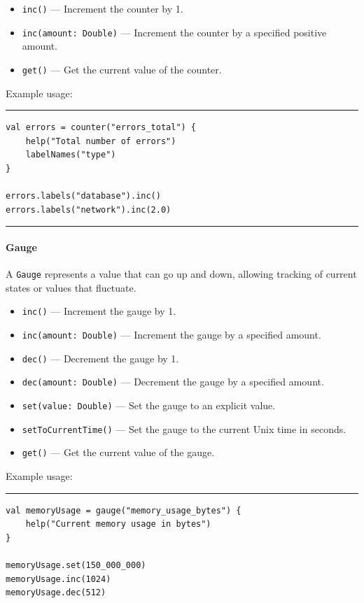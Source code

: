 \begin{itemize}
    \item \texttt{inc()} — Increment the counter by 1.
    \item \texttt{inc(amount: Double)} — Increment the counter by a specified positive amount.
    \item \texttt{get()} — Get the current value of the counter.
\end{itemize}

Example usage:

\noindent\rule{\linewidth}{0.4pt}

\begin{lstlisting}
val errors = counter("errors_total") {
    help("Total number of errors")
    labelNames("type")
}

errors.labels("database").inc()
errors.labels("network").inc(2.0)
\end{lstlisting}

\noindent\rule{\linewidth}{0.4pt}

\paragraph{Gauge}

A \texttt{Gauge} represents a value that can go up and down, allowing tracking of current states or values that fluctuate.

\begin{itemize}
    \item \texttt{inc()} — Increment the gauge by 1.
    \item \texttt{inc(amount: Double)} — Increment the gauge by a specified amount.
    \item \texttt{dec()} — Decrement the gauge by 1.
    \item \texttt{dec(amount: Double)} — Decrement the gauge by a specified amount.
    \item \texttt{set(value: Double)} — Set the gauge to an explicit value.
    \item \texttt{setToCurrentTime()} — Set the gauge to the current Unix time in seconds.
    \item \texttt{get()} — Get the current value of the gauge.
\end{itemize}

Example usage:

\noindent\rule{\linewidth}{0.4pt}

\begin{lstlisting}
val memoryUsage = gauge("memory_usage_bytes") {
    help("Current memory usage in bytes")
}

memoryUsage.set(150_000_000)
memoryUsage.inc(1024)
memoryUsage.dec(512)
\end{lstlisting}

